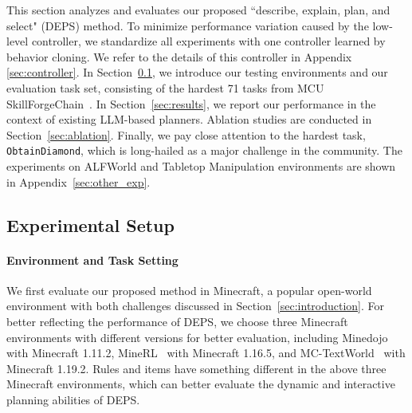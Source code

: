 \documentclass{article}
\begin{document}
This section analyzes and evaluates our proposed ``describe, explain, plan, and select" (DEPS) method.
To minimize performance variation caused by the low-level controller, we standardize all experiments with one controller learned by behavior cloning. We refer to the details of this controller in Appendix \ref{sec:controller}. 
In Section~\ref{sec:setup}, we introduce our testing environments and our evaluation task set, consisting of the hardest 71 tasks from MCU SkillForgeChain~\cite{mcu}. 
In Section~\ref{sec:results}, we report our performance in the context of existing LLM-based planners.
Ablation studies are conducted in Section~\ref{sec:ablation}. 
Finally, we pay close attention to the hardest task, \texttt{ObtainDiamond}, which is long-hailed as a major challenge in the community.
The experiments on ALFWorld and Tabletop Manipulation environments are shown in Appendix~\ref{sec:other_exp}.

\subsection{Experimental Setup}\label{sec:setup}

% 

\paragraph{Environment and Task Setting}
We first evaluate our proposed method in Minecraft, a popular open-world environment with both challenges discussed in Section~\ref{sec:introduction}. For better reflecting the performance of DEPS, we choose three Minecraft environments with different versions for better evaluation, including Minedojo~\cite{minedojo} with Minecraft 1.11.2, MineRL~\cite{vpt} with Minecraft 1.16.5, and MC-TextWorld~\cite{mcu} with Minecraft 1.19.2. Rules and items have something different in the above three Minecraft environments, which can better evaluate the dynamic and interactive planning abilities of DEPS. 


\end{document}
